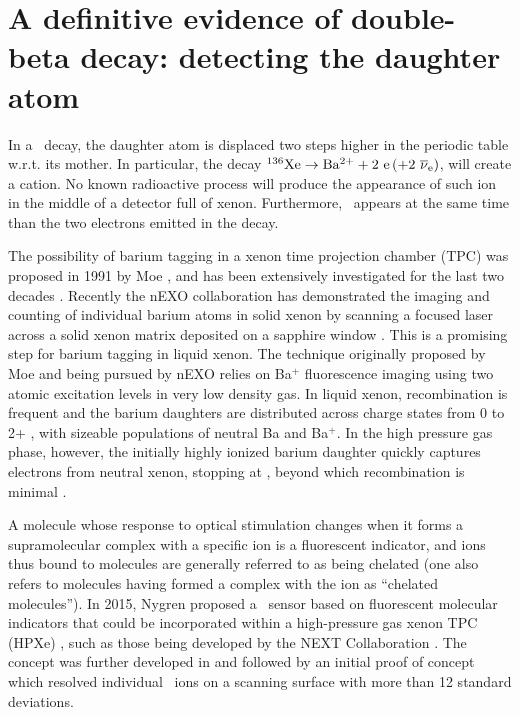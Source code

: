 \documentclass[a4paper,11pt]{article}
\begin{document}
\section{A definitive evidence of double-beta decay: detecting the daughter atom}

In a \bbonu\ decay, the daughter atom is displaced two steps higher in the periodic table w.r.t. its mother. In particular, the decay $\XE \rightarrow \Bapp + 2\ e \, (+ 2\ \overline{\nu}_{e})$, will create a \Bapp cation. No known radioactive process will produce the appearance of such ion in the middle of a detector full of xenon. Furthermore, \Bapp\ appears at the same time than the two electrons emitted in the decay. 

The possibility of barium tagging in a xenon time projection chamber (TPC) was proposed in 1991 by Moe \cite{Moe:1991ik}, and has been extensively investigated for the last two decades \cite{Danilov:2000pp, Sinclair:2011zz,  Mong:2014iya}. Recently
the nEXO collaboration has demonstrated the imaging and counting of individual barium atoms in solid xenon by scanning a focused laser across a solid xenon matrix deposited on a sapphire window \cite{Chambers:2018srx}. This is a promising step for barium tagging in liquid xenon. The technique originally proposed by Moe and being pursued by nEXO relies on Ba$^+$ fluorescence imaging using two atomic excitation levels in very low density gas. In liquid xenon, recombination is frequent and the barium daughters are distributed across charge states from 0 to 2+ \cite{PhysRevC.92.045504}, with sizeable populations of neutral Ba and  Ba$^+$.  In the high pressure gas phase, however, the initially highly ionized barium daughter quickly captures electrons from neutral xenon, stopping at \Bapp, beyond which recombination is minimal \cite{1997NIMPA.396..360B}. 

A molecule whose response to optical stimulation changes when it forms a supramolecular complex with a specific ion is a fluorescent indicator, and ions thus bound to molecules are generally referred to as being chelated (one also refers to molecules having formed a complex with the ion as ``chelated molecules''). In 2015, Nygren proposed a \Bapp\ sensor based on fluorescent molecular indicators that could be incorporated within a high-pressure gas xenon TPC (HPXe)  \cite{Nygren_2015}, such as those being developed by the 
NEXT Collaboration \cite{Nygren:2009zz, Alvarez:2012haa, Martin-Albo:2015rhw, Gomez-Cadenas:2019sfa}. The concept  was further developed in \cite{Jones:2016qiq} and followed by an initial proof of concept \cite{McDonald:2017izm} which resolved individual \Bapp\ ions on a scanning surface \cite{McDonald:2017izm} with more than 12 standard deviations. 
\end{document}
